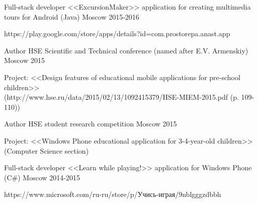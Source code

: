 \begin{cventries}

\cventry
{Full-stack developer} %
{<<ExcursionMaker>> application for creating multimedia tours for Android  (Java) } %
{Moscow} %
{2015-2016} %
{ %
	\begin{cvitems}
		\item {https://play.google.com/store/apps/details?id=com.prostorepa.anast.app}
	\end{cvitems}
}
\noindent

\cventry
{Author} %
{HSE Scientific and Technical conference (named after E.V. Armenskiy)} %
{Moscow} %
{2015} %
{ %
\begin{cvitems}
\item {Project: <<Design features of educational mobile applications for pre-school children>>
	\\ (http://www.hse.ru/data/2015/02/13/1092415379/HSE-MIEM-2015.pdf (p. 109-110))}
\end{cvitems}
}

\cventry
{Author} %
{HSE student research competition} %
{Moscow} %
{2015} %
{ %
\begin{cvitems}
\item {Project: <<Windows Phone educational application for 3-4-year-old children>> (Computer Science section)}
\end{cvitems}
}

\noindent
\cventry
{Full-stack developer} %
{<<Learn while playing!>> application for Windows Phone  (C\#) } %
{Moscow} %
{2014-2015} %
{ %
	\begin{cvitems}
		\item {https://www.microsoft.com/ru-ru/store/p/Учись-играя/9nblgggzdbbh}
	\end{cvitems}
}

\end{cventries}